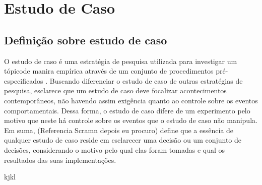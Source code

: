 \chapter{Estudo de Caso}

\section{Definição sobre estudo de caso}

O estudo de caso é uma estratégia de pesquisa utilizada para investigar um tópicode manira empírica através de um conjunto de procedimentos pré-especificados \cite{yin2001estudo}. Buscando diferenciar o estudo de caso de outras estratégias de pesquisa,  esclarece que um estudo de caso deve focalizar acontecimentos contemporâneos, não havendo assim exigência quanto ao controle sobre os eventos comportamentais. Dessa forma, o estudo de caso difere de um experimento pelo motivo que neste há controle sobre os eventos que o estudo de caso não manipula. Em suma, (Referencia Scramn depois eu procuro) define que a essência de qualquer estudo de caso reside em esclarecer uma decisão ou um conjunto de decisões, considerando o motivo pelo qual elas foram tomadas e qual os resultados das suas implementações.

kjkl


\label{estudo de caso}

